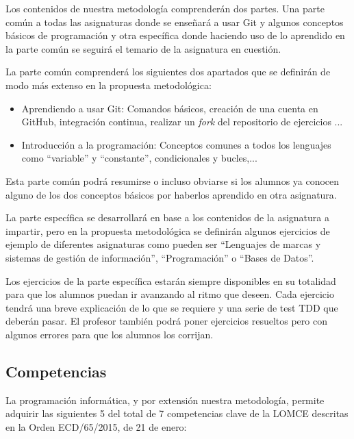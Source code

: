Los contenidos de nuestra metodología comprenderán dos partes. Una parte común a todas las asignaturas donde se enseñará a usar Git y algunos conceptos básicos de programación y otra específica donde haciendo uso de lo aprendido en la parte común se seguirá el temario de la asignatura en cuestión.


\bigskip
La parte común comprenderá los siguientes dos apartados que se definirán de modo más extenso en la propuesta metodológica:

\begin{itemize}
    \item Aprendiendo a usar Git: Comandos básicos, creación de una cuenta en GitHub, integración continua, realizar un \textit{fork} del repositorio de ejercicios ...
    \item Introducción a la programación: Conceptos comunes a todos los lenguajes como ``variable'' y ``constante'', condicionales y bucles,...
\end{itemize}

Esta parte común podrá resumirse o incluso obviarse si los alumnos ya conocen alguno de los dos conceptos básicos por haberlos aprendido en otra asignatura.

\bigskip
La parte específica se desarrollará en base a los contenidos de la asignatura a impartir, pero en la propuesta metodológica se definirán algunos ejercicios de ejemplo de diferentes asignaturas como pueden ser ``Lenguajes de marcas y sistemas de gestión de información'', ``Programación'' o ``Bases de Datos''.

\bigskip
Los ejercicios de la parte específica estarán siempre disponibles en su totalidad para que los alumnos puedan ir avanzando al ritmo que deseen. Cada ejercicio tendrá una breve explicación de lo que se requiere y una serie de test TDD que deberán pasar. El profesor también podrá poner ejercicios resueltos pero con algunos errores para que los alumnos los corrijan.

\subsection{Competencias}

La programación informática, y por extensión nuestra metodología, permite adquirir las siguientes 5 del total de 7 competencias clave de la LOMCE descritas en la Orden ECD/65/2015, de 21 de enero:

